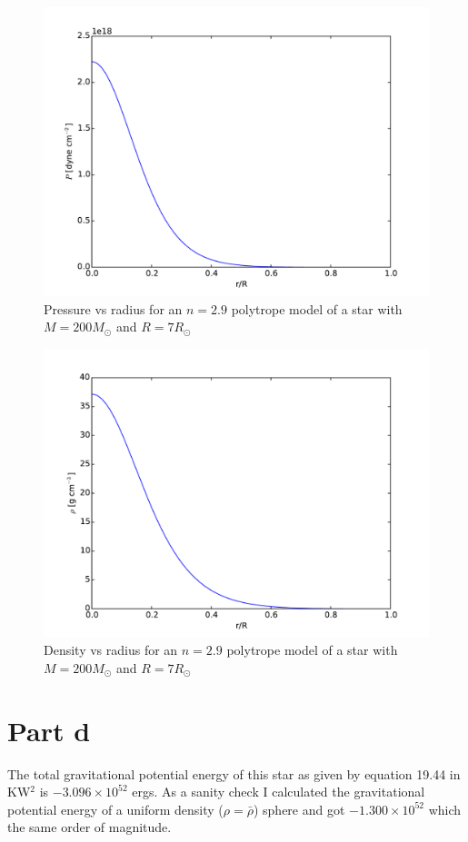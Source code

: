 \documentclass[11pt]{paper}
\begin{document}
\begin{figure}[htbp]
\begin{center}
\includegraphics[width=\pagewidth]{pressure2.9.pdf}
\caption{Pressure vs radius for an $n=2.9$ polytrope model of a star with $M=200M_\odot$ and $R=7R_\odot$}
\label{P}
\end{center}
\end{figure}

\begin{figure}[htbp]
\begin{center}
\includegraphics[width=\pagewidth]{density2.9.pdf}
\caption{Density vs radius for an $n=2.9$ polytrope model of a star with $M=200M_\odot$ and $R=7R_\odot$}
\label{P}
\end{center}
\end{figure}

\section{Part d}
The total gravitational potential energy of this star as given by equation 19.44 in KW$^2$ is $-3.096\times10^{52}$ ergs. As a sanity check I calculated the gravitational potential energy of a uniform density ($\rho=\bar{\rho}$) sphere and got $-1.300\times10^{52}$ which the same order of magnitude.
\end{document}
